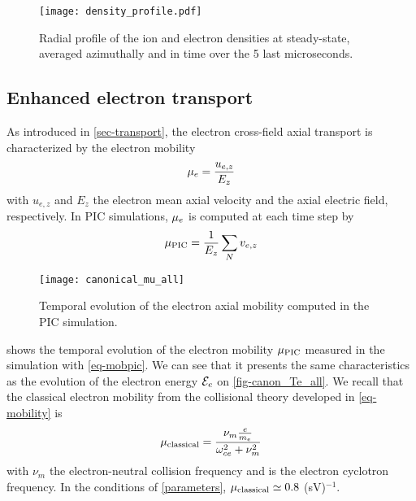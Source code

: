   \begin{figure}[hbtp]
    \centering
    \texttt{[image: density\_profile.pdf]}
    \caption{Radial profile of the ion and electron densities at steady-state, averaged azimuthally and in time over the 5 last microseconds.}
    \label{fig-profiles}
  \end{figure}
  
  \subsection{Enhanced electron transport} \label{subsec-canonmue}
  As introduced in \cref{sec-transport}, the electron cross-field axial transport is characterized by the electron mobility
  \begin{equation} \label{eq-mobdef}
    \mu_e = \frac{u_{e, z}}{E_z}
  \end{equation}
  with $u_{e,z}$ and $E_z$ the electron mean axial velocity and the axial electric field, respectively.
  In \ac{PIC} simulations, $\mu_e$ is computed at each time step by
  \begin{equation} \label{eq-mobpic}
    \mu_{\mathrm{PIC}} = \frac{1}{E_z} \sum_N v_{e,z}
  \end{equation}

  \begin{figure}[hbtp]
    \centering
    \texttt{[image: canonical\_mu\_all]}
    \caption{Temporal evolution of the electron axial mobility computed in the \ac{PIC} simulation.}
    \label{fig-canon_mu}
  \end{figure}
  
   shows the temporal evolution of the electron mobility $\mu_{\mathrm{PIC}}$ measured in the simulation with \cref{eq-mobpic}.
  We can see that it presents the same characteristics as the evolution of the electron energy ${\mathcal{E}_e}$ on \cref{fig-canon_Te_all}.
  We recall that the classical electron mobility from the collisional theory developed in \cref{eq-mobility} is \citep{lafleur2016a}
  \begin{equation} \label{eq-muclass}
    \mu_{\mathrm{classical}} = \frac{\nu_m \frac{e}{m_e}}{\omega_{ce}^2 + \nu_m^2}
  \end{equation}
  with $\nu_m$ the electron-neutral  collision frequency and \oce is the electron cyclotron frequency.
  In the conditions of \cref{parameters}, $\mu_{\mathrm{classical}} \simeq 0.8$ \square\meter(sV)$^{-1}$.
  
